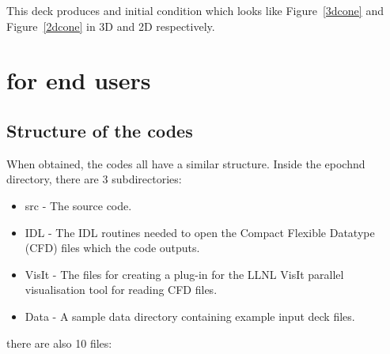 \documentclass[12pt,a4paper]{article}
\newcommand{\EPOCH}{{\color{warwickdark}\fontfamily{phv}\selectfont{EPOCH}}}
\begin{document}
This deck produces and initial condition which looks like Figure~\ref{3dcone}
and Figure~\ref{2dcone} in 3D and 2D respectively.
\pagebreak

\section{{\EPOCH} for end users}
\label{sec:endusers}

\subsection{Structure of the {\EPOCH} codes}
When obtained, the {\EPOCH} codes all have a similar structure. Inside the
epoch{n}d directory, there are 3 subdirectories:

\begin{itemize}
\item src - The {\EPOCH} source code.
\item IDL - The IDL routines needed to open the Compact Flexible Datatype
  (CFD) files which the code outputs.
\item VisIt - The files for creating a plug-in for the LLNL VisIt parallel
  visualisation tool for reading CFD files.
\item Data - A sample data directory containing example input deck files.
\end{itemize}
there are also 10 files:
\end{document}
